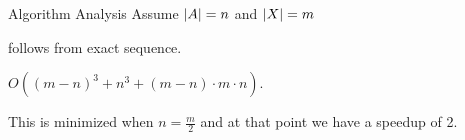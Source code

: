 \begin{frame}{Algorithm Analysis}
Assume $\left|{A}\right| = n$ and $\left|{X}\right| = m$

\begin{description}
\item<1->[Correctness] follows from exact sequence.
\item<2->[Complexity] $O((m-n)^3 + n^3 + (m-n) \cdot m \cdot n)$. 
\item<3->[Speedup] This is minimized when $n = \frac{m}{2}$ and at that point we have a speedup of 2.
\end{description}
\end{frame}



